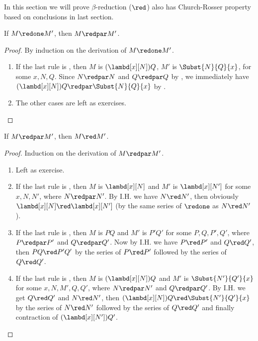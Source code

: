 \documentclass[../../../include/open-logic-section]{subfiles}
\begin{document}


In this section we will prove $\beta$-reduction ($\red$) also has
Church-Rosser property based on conclusions in last section.

\begin{lem}
  If $M \redone M'$, then $M \redpar M'$.
\end{lem}
\begin{proof} By induction on the derivation of $M \redone M'$.
  \begin{enumerate}
  \item If the last rule is , then $M$ is
    $(\lambd[x][N])Q$, $M'$ is $\Subst{N}{Q}{x}$, for some
    $x, N, Q$. Since $N \redpar N$ and $Q \redpar Q$ by
    , we immediately have $(\lambd[x][N])Q
    \redpar \Subst{N}{Q}{x}$ by .
  \item The other cases are left as exercises.
  \end{enumerate}
\end{proof}

\begin{lem}
  If $M \redpar M'$, then $M \red M'$.
\end{lem}
\begin{proof} Induction on the derivation of $M \redpar M'$.
  \begin{enumerate}
  \item Left as exercise.
  \item If the last rule is , then $M$ is 
    $\lambd[x][N]$ and $M'$ is $\lambd[x][N']$ for some $x, N, N'$, where
    $N \redpar N'$. By I.H. we have $N \red N'$, then obviously
    $\lambd[x][N] \red \lambd[x][N']$ (by the same series of
    $\redone$ as $N \red N'$).
  \item If the last rule is , then $M$ is 
    $PQ$ and $M'$ is $P'Q'$ for some $P, Q, P', Q'$, where $P \redpar P'$
    and $Q \redpar Q'$. Now by I.H. we have $P \red P'$ and $Q \red
    Q'$, then $PQ \red P'Q'$ by the series of $P \red P'$ followed
    by the series of $Q \red Q'$.
  \item If the last rule is , then $M$ is
    $(\lambd[x][N])Q$ and $M'$ is  $\Subst{N'}{Q'}{x}$ for some
    $x, N, M', Q, Q'$, where $N \redpar N'$ and $Q \redpar Q'$. By I.H. we get $Q \red
    Q'$ and $N \red N'$, then $(\lambd[x][N])Q \red
    \Subst{N'}{Q'}{x}$ by the series of $N \red N'$ followed by the
    series of $Q \red Q'$ and finally contraction of
    $(\lambd[x][N'])Q'$.
  \end{enumerate}
\end{proof}
\end{document}
